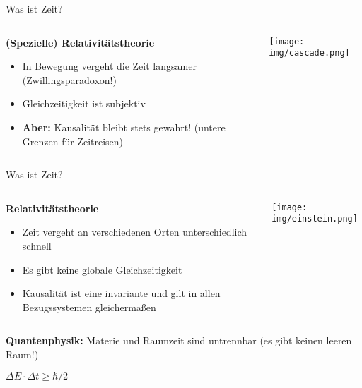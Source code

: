 \begin{frame}{Was ist Zeit?}
    \begin{columns}
        \begin{column}{.6\textwidth}
            \textbf{(Spezielle) Relativitätstheorie}\\
            \begin{itemize}
                \item In Bewegung vergeht die Zeit langsamer (Zwillingsparadoxon!)
                \item Gleichzeitigkeit ist subjektiv
                \item \textbf{Aber:} Kausalität bleibt stets gewahrt! (untere Grenzen für Zeitreisen)
            \end{itemize}
        \end{column}
        \begin{column}{.4\textwidth}
            \centering
            \texttt{[image: img/cascade.png]}\\
            \centering
            \scalebox{.4}{(aussiegall [CC BY 2.0])}
        \end{column}
    \end{columns}
\end{frame}

\begin{frame}{Was ist Zeit?}
    \begin{columns}
        \begin{column}{.65\textwidth}
            \textbf{Relativitätstheorie}\\
            \begin{itemize}
                \item Zeit vergeht an verschiedenen Orten unterschiedlich schnell
                \item Es gibt keine globale Gleichzeitigkeit
                \item Kausalität ist eine invariante und gilt in allen Bezugssystemen gleichermaßen
            \end{itemize}
        \end{column}
        \begin{column}{.35\textwidth}
            \centering
            \texttt{[image: img/einstein.png]}\\
            \centering
            \scalebox{.4}{(Ferdinand Schmutzer [Public domain])}
        \end{column}
    \end{columns}

    \begin{center}
        \scalebox{2.}{\&}
    \end{center}

    \textbf{Quantenphysik:} Materie und Raumzeit sind untrennbar (es gibt keinen leeren Raum!)
    \begin{center}
        $\Delta E \cdot \Delta t \ge \hbar / 2$
    \end{center}
\end{frame}
